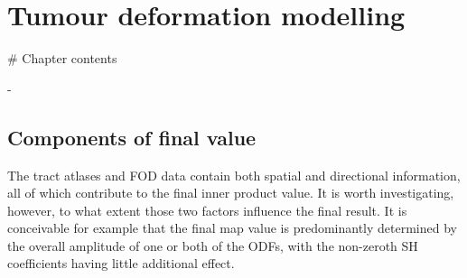 \chapter{Tumour deformation modelling}
\label{chapterlabel3}

\begin{markdown}

  # Chapter contents

  -

\end{markdown}

\section{Components of final value}

The tract atlases and FOD data contain both spatial and directional information, all of which contribute to the final inner product value.
It is worth investigating, however, to what extent those two factors influence the final result.
It is conceivable for example that the final map value is predominantly determined by the overall amplitude of one or both of the ODFs, with the non-zeroth SH coefficients having little additional effect.
